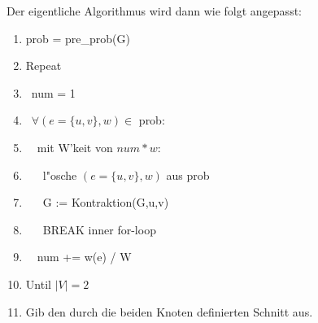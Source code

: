 \documentclass{article}
\newcommand{\tab}{\null\ \qquad}
\begin{document}
Der eigentliche Algorithmus wird dann wie folgt angepasst:\\
\begin{enumerate}
    \item prob = pre\_prob(G)
    \item Repeat
    \item \tab num = 1
    \item \tab $\forall (e=\{u,v\}, w) \in$ prob:
    \item \tab \tab mit W'keit von $num * w$:
    \item \tab \tab \tab l"osche $(e=\{u,v\}, w)$ aus prob
    \item \tab \tab \tab G := Kontraktion(G,u,v)
    \item \tab \tab \tab BREAK inner for-loop
    \item \tab \tab num += w(e) / W
    \item Until $|V| = 2$
    \item Gib den durch die beiden Knoten definierten Schnitt aus.\\
\end{enumerate}
\end{document}
